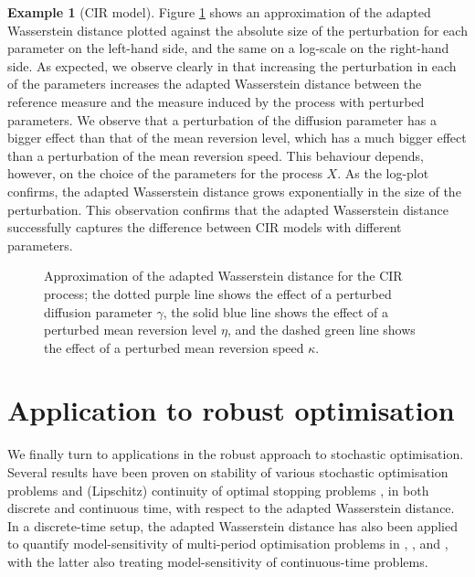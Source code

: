 \documentclass[onseside, final]{amsart}
\theoremstyle{definition}
\newtheorem{example}[theorem]{Example}
\numberwithin{equation}{section}
\begin{document}
\begin{example}[CIR model]
		Figure \ref{fig:cir} shows an approximation of the adapted Wasserstein distance plotted against the absolute size of the perturbation for each parameter on the left-hand side, and the same on a log-scale on the right-hand side.
		As expected, we observe clearly in  that increasing the perturbation in each of the parameters increases the adapted Wasserstein distance between the reference measure and the measure induced by the process with perturbed parameters. We observe that a perturbation of the diffusion parameter has a bigger effect than that of the mean reversion level, which has a much bigger effect than a perturbation of the mean reversion speed. This behaviour depends, however, on the choice of the parameters for the process $X$.
		As the log-plot confirms, the adapted Wasserstein distance grows exponentially in the size of the perturbation.
		This observation confirms that the adapted Wasserstein distance successfully captures the difference between CIR models with different parameters.
		\begin{figure}[ht]
			\centering
			
			\quad
			
			\caption{Approximation of the adapted Wasserstein distance for the CIR process; the dotted purple line shows the effect of a perturbed diffusion parameter $\gamma$, the solid blue line shows the effect of a perturbed mean reversion level $\eta$, and the dashed green line shows the effect of a perturbed mean reversion speed $\kappa$.} 
			\label{fig:cir}
		\end{figure}
	\end{example}
	
\section{Application to robust optimisation}\label{sec:finance}
	We finally turn to applications in the robust approach to stochastic optimisation. Several results have been proven on stability of various stochastic optimisation problems \citep{AcBaZa20,BaBaBeEd19a} and (Lipschitz) continuity of optimal stopping problems \citep{AcBaZa20,BaBaBeEd19b,Al81}, in both discrete and continuous time, with respect to the adapted Wasserstein distance. In a discrete-time setup, the adapted Wasserstein distance has also been applied to quantify model-sensitivity of multi-period optimisation problems in \citep{AnPf14}, \citep{BaWi23}, and \citep{JiOb24}, with the latter also treating model-sensitivity of continuous-time problems.
	
\end{document}
